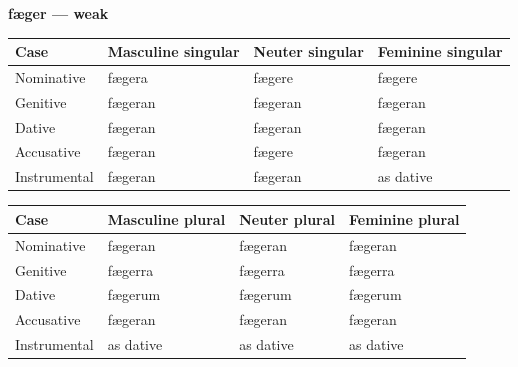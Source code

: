 \textbf{fæger — weak}

\par\begingroup
\fontsize{10.5}{13.2}\selectfont
\setlength{\LTleft}{0pt}\setlength{\LTright}{\fill}
\noindent
\begin{tabular}{@{}>{\raggedright\arraybackslash}p{22.0mm}>{\raggedright\arraybackslash}p{31.188mm}>{\raggedright\arraybackslash}p{31.188mm}>{\raggedright\arraybackslash}p{31.188mm}@{}}
\toprule
\textbf{Case} & \textbf{Masculine singular} & \textbf{Neuter singular} & \textbf{Feminine singular} \\
\midrule
Nominative & fægera & fægere & fægere \\
Genitive & fægeran & fægeran & fægeran \\
Dative & fægeran & fægeran & fægeran \\
Accusative & fægeran & fægere & fægeran \\
Instrumental & fægeran & fægeran & as dative \\
\bottomrule
\end{tabular}
\par\endgroup
\par\addvspace{5pt}
\par\begingroup
\fontsize{10.5}{13.2}\selectfont
\setlength{\LTleft}{0pt}\setlength{\LTright}{\fill}
\noindent
\begin{tabular}{@{}>{\raggedright\arraybackslash}p{22.0mm}>{\raggedright\arraybackslash}p{31.188mm}>{\raggedright\arraybackslash}p{31.188mm}>{\raggedright\arraybackslash}p{31.188mm}@{}}
\toprule
\textbf{Case} & \textbf{Masculine plural} & \textbf{Neuter plural} & \textbf{Feminine plural} \\
\midrule
Nominative & fægeran & fægeran & fægeran \\
Genitive & fægerra & fægerra & fægerra \\
Dative & fægerum & fægerum & fægerum \\
Accusative & fægeran & fægeran & fægeran \\
Instrumental & as dative & as dative & as dative \\
\bottomrule
\end{tabular}
\par\endgroup

